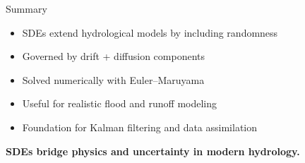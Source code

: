\documentclass[8pt]{beamer}
\begin{document}
\begin{frame}{Summary}
\begin{itemize}
 \item SDEs extend hydrological models by including randomness
 \item Governed by drift + diffusion components
 \item Solved numerically with Euler--Maruyama
 \item Useful for realistic flood and runoff modeling
 \item Foundation for Kalman filtering and data assimilation
\end{itemize}

\centering
\textbf{SDEs bridge physics and uncertainty in modern hydrology.}
\end{frame}
\end{document}
